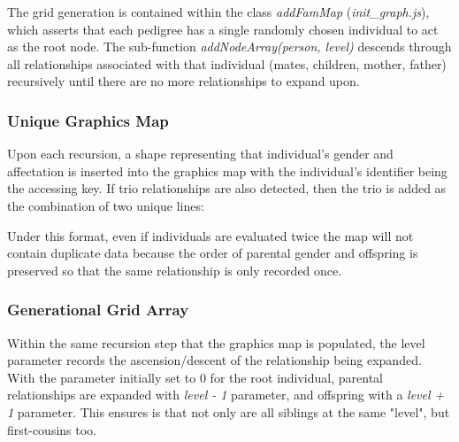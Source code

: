 The grid generation is contained within the class \textit{addFamMap} (\textit{init\_graph.js}), which asserts that each pedigree has a single randomly chosen individual to act as the root node. The sub-function \textit{addNodeArray(person, level)} descends through all relationships associated with that individual (mates, children, mother, father) recursively until there are no more relationships to expand upon.

\subsubsection{Unique Graphics Map}
Upon each recursion, a shape representing that individual's gender and affectation is inserted into the graphics map with the individual's identifier being the accessing key. If trio relationships are also detected, then the trio is added as the combination of two unique lines:
\begin{description}

\end{description}

Under this format, even if individuals are evaluated twice the map will not contain duplicate data because the order of parental gender and offspring is preserved so that the same relationship is only recorded once.

\subsubsection{Generational Grid Array}

Within the same recursion step that the graphics map is populated, the level parameter records the ascension/descent of the relationship being expanded.  With the parameter initially set to 0 for the root individual, parental relationships are expanded with \textit{level - 1} parameter, and offspring with a \textit{level + 1} parameter. This ensures is that not only are all siblings at the same "level", but first-cousins too.

